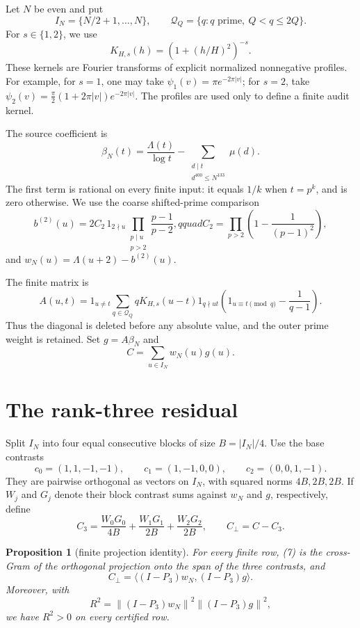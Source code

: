 \documentclass[11pt]{article}
\newtheorem{proposition}{Proposition}
\newcommand{\cQ}{\mathcal Q}
\newcommand{\norm}[1]{\left\lVert #1\right\rVert}
\begin{document}
Let \(N\) be even and put
\[
 I_N=\{N/2+1,\ldots,N\},\qquad
 \cQ_Q=\{q:q\text{ prime},\ Q<q\leq 2Q\}.
\]
For \(s\in\{1,2\}\), we use
\[
 K_{H,s}(h)=\left(1+(h/H)^2\right)^{-s}.                 \tag{1}
\]
These kernels are Fourier transforms of explicit normalized nonnegative
profiles.  For example, for \(s=1\), one may take
\(\psi_1(v)=\pi e^{-2\pi\lvert v\rvert}\); for \(s=2\), take
\(\psi_2(v)=\frac\pi2(1+2\pi\lvert v\rvert)e^{-2\pi\lvert v\rvert}\).
The profiles are used only to define a finite audit kernel.

The source coefficient is
\[
 \beta_N(t)=\frac{\Lambda(t)}{\log t}
 -\sum_{\substack{d\mid t\\d^{400}\leq N^{133}}}\mu(d).       \tag{2}
\]
The first term is rational on every finite input: it equals \(1/k\) when
\(t=p^k\), and is zero otherwise.  We use the coarse shifted-prime
comparison
\[
 b^{(2)}(u)=2C_2\,1_{2\nmid u}
       \prod_{\substack{p\mid u\\p>2}}\frac{p-1}{p-2},qquad
 C_2=\prod_{p>2}\left(1-\frac1{(p-1)^2}\right),                 \tag{3}
\]
and \(w_N(u)=\Lambda(u+2)-b^{(2)}(u)\).

The finite matrix is
\[
 A(u,t)=1_{u\ne t}\sum_{q\in\cQ_Q}qK_{H,s}(u-t)1_{q\nmid ut}
 \left(1_{u\equiv t\pmod q}-\frac1{q-1}\right).             \tag{4}
\]
Thus the diagonal is deleted before any absolute value, and the outer prime
weight is retained.  Set \(g=A\beta_N\) and
\[
 C=\sum_{u\in I_N}w_N(u)g(u).                                \tag{5}
\]

\section{The rank-three residual}

Split \(I_N\) into four equal consecutive blocks of size \(B=|I_N|/4\).
Use the base contrasts
\[
 c_0=(1,1,-1,-1),\qquad c_1=(1,-1,0,0),\qquad
 c_2=(0,0,1,-1).                                               \tag{6}
\]
They are pairwise orthogonal as vectors on \(I_N\), with squared norms
\(4B,2B,2B\).  If \(W_j\) and \(G_j\) denote their block contrast sums
against \(w_N\) and \(g\), respectively, define
\[
 C_3=\frac{W_0G_0}{4B}+\frac{W_1G_1}{2B}+\frac{W_2G_2}{2B},
 \qquad C_\perp=C-C_3.                                        \tag{7}
\]

\begin{proposition}[finite projection identity]
For every finite row, (7) is the cross-Gram of the orthogonal projection
onto the span of the three contrasts, and
\[
 C_\perp=\langle (I-P_3)w_N,(I-P_3)g\rangle.                 \tag{8}
\]
Moreover, with
\[
 R^2=\norm{(I-P_3)w_N}^2\norm{(I-P_3)g}^2,                   \tag{9}
\]
we have \(R^2>0\) on every certified row.
\end{proposition}
\end{document}
